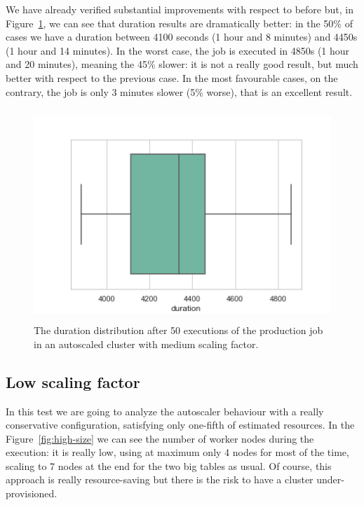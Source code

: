 \documentclass[12pt,twoside,cucitura]{toptesi}
\begin{document}
We have already verified substantial improvements with respect to before but, in Figure~\ref{fig:medium-duration}, we can see that duration results are dramatically better: in the 50\% of cases we have a duration between 4100 seconds (1 hour and 8 minutes) and 4450s (1 hour and 14 minutes). In the worst case, the job is executed in 4850s (1 hour and 20 minutes), meaning the 45\% slower: it is not a really good result, but much better with respect to the previous case. In the most favourable cases, on the contrary, the job is only 3 minutes slower (5\% worse), that is an excellent result.

\begin{figure}
\centering
\includegraphics[height=80mm]{medium-duration}
\caption{The duration distribution after 50 executions of the production job in an autoscaled cluster with medium scaling factor.}\label{fig:medium-duration}
\end{figure}

\subsection{Low scaling factor}
In this test we are going to analyze the autoscaler behaviour with a really conservative configuration, satisfying only one-fifth of estimated resources. In the Figure~\ref{fig:high-size} we can see the number of worker nodes during the execution: it is really low, using at maximum only 4 nodes for most of the time, scaling to 7 nodes at the end for the two big tables as usual. Of course, this approach is really resource-saving but there is the risk to have a cluster under-provisioned.
\end{document}
